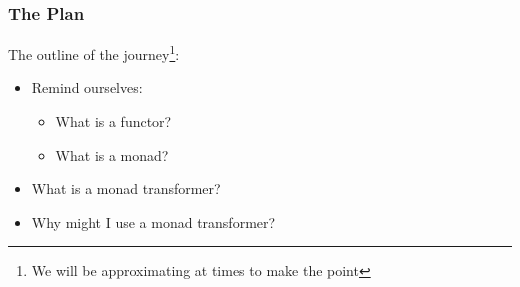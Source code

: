 \begin{frame}
\frametitle{The Plan}

The outline of the journey\footnote{We will be approximating at times to make the point}:

\begin{itemize}
  \item Remind ourselves:
  \begin{itemize}
    \item What is a functor?
    \item What is a monad?
  \end{itemize}
  \item What is a monad transformer?
  \item Why might I use a monad transformer?
\end{itemize}
\end{frame}
